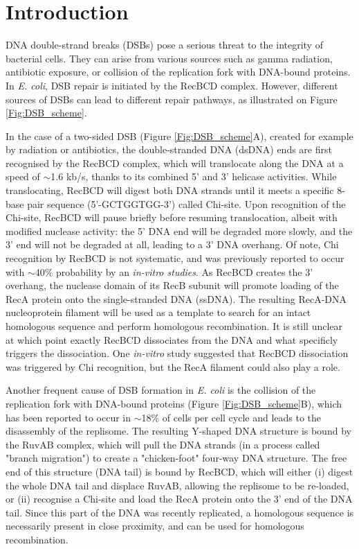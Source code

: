 \section*{Introduction}

DNA double-strand breaks (DSBs) pose a serious threat to the integrity of bacterial cells. They can arise from various sources such as gamma radiation\cite{Krasin1977}, antibiotic exposure, or collision of the replication fork with DNA-bound proteins\cite{Dillingham2008}. In \emph{E. coli}, DSB repair is initiated by the RecBCD complex. However, different sources of DSBs can lead to different repair pathways, as illustrated on Figure \ref{Fig:DSB_scheme}.

In the case of a two-sided DSB (Figure \ref{Fig:DSB_scheme}A), created for example by radiation or antibiotics, the double-stranded DNA (dsDNA) ends are first recognised by the RecBCD complex, which will translocate along the DNA at a speed of $\sim$1.6 kb/s, thanks to its combined 5' and 3' helicase activities\cite{Wiktor2018}. While translocating, RecBCD will digest both DNA strands until it meets a specific 8-base pair sequence (5'-GCTGGTGG-3') called Chi-site. Upon recognition of the Chi-site, RecBCD will pause briefly before resuming translocation, albeit with modified nuclease activity: the 5' DNA end will be degraded more slowly, and the 3' end will not be degraded at all, leading to a 3' DNA overhang. Of note, Chi recognition by RecBCD is not systematic, and was previously reported to occur with $\sim$40\% probability by an \emph{in-vitro studies}\cite{Taylor1992}. As RecBCD creates the 3' overhang, the nuclease domain of its RecB subunit will promote loading of the RecA protein onto the single-stranded DNA (ssDNA)\cite{Churchill2000, Spies2006}. The resulting RecA-DNA nucleoprotein filament will be used as a template to search for an intact homologous sequence and perform homologous recombination. It is still unclear at which point exactly RecBCD dissociates from the DNA and what specificly triggers the dissociation. One \emph{in-vitro} study suggested that RecBCD dissociation was triggered by Chi recognition\cite{Taylor1999}, but the RecA filament could also play a role.

Another frequent cause of DSB formation in \emph{E. coli} is the collision of the replication fork with DNA-bound proteins (Figure \ref{Fig:DSB_scheme}B), which has been reported to occur in $\sim$18\% of cells per cell cycle\cite{Sinha2018} and leads to the disassembly of the replisome\cite{Michel1997}. The resulting Y-shaped DNA structure is bound by the RuvAB complex, which will pull the DNA strands (in a process called "branch migration") to create a "chicken-foot" four-way DNA structure\cite{Seigneur1998}. The free end of this structure (DNA tail) is bound by RecBCD, which will either (i) digest the whole DNA tail and displace RuvAB, allowing the replisome to be re-loaded, or (ii) recognise a Chi-site and load the RecA protein onto the 3' end of the DNA tail\cite{Michel2001}. Since this part of the DNA was recently replicated, a homologous sequence is necessarily present in close proximity, and can be used for homologous recombination.

